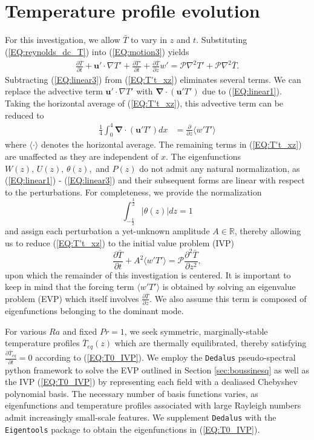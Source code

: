 \documentclass[reprint,amsmath,amssymb,aps]{revtex4-1}
\renewcommand{\vec}[1]{\boldsymbol{#1}}
\newcommand{\grad}{\vec{\nabla}}
\begin{document}
\section{Temperature profile evolution}\label{sec:evolution}
For this investigation, we allow $ \bar{T}$ to vary in $z$ and $t$. Substituting (\ref{EQ:reynolds_dc_T}) into (\ref{EQ:motion3}) yields
\begin{align}
    \frac{\partial \bar{T}}{\partial t} + \mathbf{u}' \cdot \nabla T' + \frac{\partial T'}{\partial t} + \frac{\partial \bar{T}}{\partial z} w' = \mathcal{P} \nabla^2 T' + \mathcal{P} \nabla^2 \bar{T}.
    \label{EQ:T't_xz}
\end{align}
Subtracting (\ref{EQ:linear3}) from (\ref{EQ:T't_xz}) eliminates several terms. 
We can replace the advective term $\mathbf{u}' \cdot \nabla T'$ with $\grad \cdot (\mathbf{u}'T')$ due to (\ref{EQ:linear1}). 
Taking the horizontal average of (\ref{EQ:T't_xz}), this advective term can be reduced to
\begin{align}
    \frac{1}{4}\int_0^4 \grad \cdot (\mathbf{u}'T') dx &= \frac{\partial }{\partial z}  \langle w'T' \rangle
\end{align}
where $\langle \cdot \rangle$ denotes the horizontal average. 
The remaining terms in (\ref{EQ:T't_xz}) are unaffected as they are independent of $x$. 
The eigenfunctions $W(z),\, U(z),\, \theta(z),$ and $P(z)$ do not admit any natural normalization, as (\ref{EQ:linear1}) - (\ref{EQ:linear3}) and their subsequent forms are linear with respect to the perturbations. 
For completeness, we provide the normalization 
\begin{equation}
    \int_{-\frac{1}{2}}^{\frac{1}{2}} \big| \theta (z) \big| dz = 1
\end{equation}
and assign each perturbation a yet-unknown amplitude $A \in \mathbb{R}$, thereby allowing us to reduce (\ref{EQ:T't_xz}) to the initial value problem (IVP)
\begin{equation}
    \frac{\partial \bar{T}}{\partial t} + A^2 \langle w'T' \rangle = \mathcal{P}  \frac{\partial^2 \bar{T}}{\partial z^2}, \label{EQ:T0_IVP}
\end{equation}
upon which the remainder of this investigation is centered. 
It is important to keep in mind that the forcing term $\langle w'T' \rangle$ is obtained by solving an eigenvalue problem (EVP) which itself involves $\frac{\partial \bar{T}}{\partial z}$. 
We also assume this term is composed of eigenfunctions belonging to the dominant mode. 
\par For various $Ra$ and fixed $Pr = 1$, we seek symmetric, marginally-stable temperature profiles $\bar{T}_{eq}(z)$ which are thermally equilibrated, thereby satisfying $\frac{\partial \bar{T}_{eq}}{\partial t} = 0$ according to (\ref{EQ:T0_IVP}). 
We employ the \texttt{Dedalus} pseudo-spectral python framework to solve the EVP outlined in Section \ref{sec:boussinesq} as well as the IVP (\ref{EQ:T0_IVP}) by representing each field with a dealiased Chebyshev polynomial basis. 
The necessary number of basis functions varies, as eigenfunctions and temperature profiles associated with large Rayleigh numbers admit increasingly small-scale features. 
We supplement \texttt{Dedalus} with the \texttt{Eigentools} package to obtain the eigenfunctions in (\ref{EQ:T0_IVP}).
\end{document}

